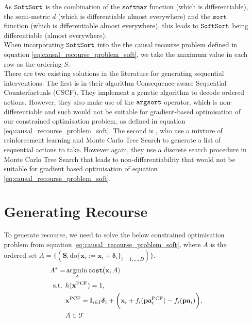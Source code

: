As $\operatorname*{\texttt{SoftSort}}$ is the combination of the $\texttt{softmax}$ function (which is differentiable), the semi-metric $d$ (which is differentiable almost everywhere) and the $\texttt{sort}$ function (which is differentiable almost everywhere), this leads to $\operatorname*{\texttt{SoftSort}}$ being differentiable (almost everywhere).\\

When incorporating $\operatorname*{\texttt{SoftSort}}$ into the the causal recourse problem defined in equation \ref{eq:causal_recourse_problem_soft}, we take the maximum value in each row as the ordering $S$.\\

There are two existing solutions in the literature for generating sequential interventions. The first is \textcite{naumannConsequenceAwareSequentialCounterfactual2021} in their algorithm Consequence-aware Sequential Counterfactuals (CSCF). They implement a genetic algorithm to decode ordered actions. However, they also make use of the $\operatorname*{\texttt{argsort}}$ operator, which is non-differentiable and such would not be suitable for gradient-based optimisation of our constrained optimisation problem, as defined in equation \ref{eq:causal_recourse_problem_soft}. The second is \textcite{detoniSynthesizingExplainableCounterfactual2023}, who use a mixture of reinforcement learning and Monte Carlo Tree Search to generate a list of sequential actions to take. However again, they use a discrete search procedure in Monte Carlo Tree Search that leads to non-differentiability that would not be suitable for gradient based optimisation of equation \ref{eq:causal_recourse_problem_soft}.

\section{Generating Recourse} \label{section:generating_recourse}

To generate recourse, we need to solve the below constrained optimisation problem from equation \ref{eq:causal_recourse_problem_soft}, where $A$ is the ordered set $A = \big\{(\mathbf{S}, \text{do} \{\mathbf{x}_i:=\mathbf{x}_i + \boldsymbol{\delta}_i\}_{i=1, \ldots, D})\big\}$.\\

\begin{align}
	A^* = & \operatorname*{argmin}_{A} \texttt{cost}(\mathbf{x}, A) \\ \nonumber
	\text{s.t. } & h(\mathbf{x}^{\text{PCF}}) = 1, \\ \nonumber
	& 	\mathbf{x}^{\text{PCF}} = \mathbb{I}_{i \in I} \boldsymbol{\delta}_i + \bigg( \mathbf{x}_i + f_i(\textbf{pa}^{\text{PCF}}_i) - f_i(\textbf{pa}_i) \bigg), \\ \nonumber
	& A \in \mathcal{F}
\end{align} 

